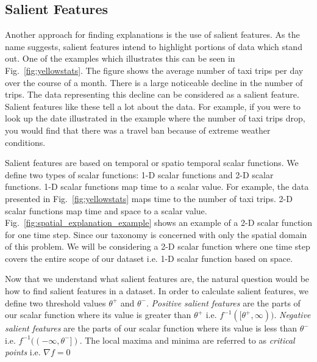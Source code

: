 \subsection{Salient Features}
\label{sec:salient_features}

Another approach for finding explanations is the use of salient features. As the name suggests, salient features intend to highlight portions of data which stand out. One of the examples which illustrates this can be seen in Fig.~\ref{fig:yellowstats}. The figure shows the average number of taxi trips per day over the course of a month. There is a large noticeable decline in the number of trips. The data representing this decline can be considered as a salient feature. Salient features like these tell a lot about the data. For example, if you were to look up the date illustrated in the example where the number of taxi trips drop, you would find that there was a travel ban because of extreme weather conditions. 

Salient features are based on temporal or spatio temporal scalar functions. We define two types of scalar functions: 1-D scalar functions and 2-D scalar functions. 1-D scalar functions map time to a scalar value. For example, the data presented in Fig.~\ref{fig:yellowstats} maps time to the number of taxi trips. 2-D scalar functions map time and space to a scalar value.  Fig.~\ref{fig:spatial_explanation_example} shows an example of a 2-D scalar function for one time step. Since our taxonomy is concerned with only the spatial domain of this problem. We will be considering a 2-D scalar function where one time step covers the entire scope of our dataset i.e. 1-D scalar function based on space. 

Now that we understand what salient features are, the natural question would be how to find salient features in a dataset. In order to calculate salient features, we define two threshold values $\theta^+$ and $\theta^-$. \textit{Positive salient features} are the parts of our scalar function where its value is greater than $\theta^+$ i.e. $f^{-1}([\theta^+, \infty))$. \textit{Negative salient features} are the parts of our scalar function where its value is less than $\theta^-$ i.e. $f^{-1}((-\infty, \theta^-])$. The local maxima and minima are referred to as \textit{critical points} i.e. $\nabla f = 0$

